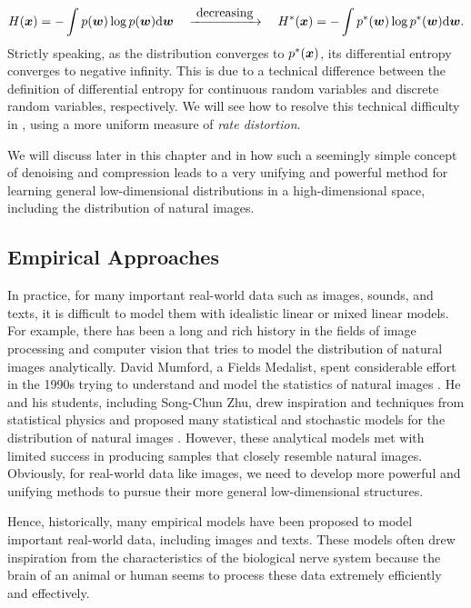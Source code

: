 \documentclass[../../book-main.tex]{subfiles}
\begin{document}
\begin{equation}
H(\bm{x}) = - \int p(\boldsymbol{w}) \log p(\boldsymbol{w}) \mathrm{d}\boldsymbol{w}  \quad \xrightarrow{\hspace{1mm} \mbox{decreasing} \hspace{1mm}} \quad H^*(\bm{x}) = - \int p^*(\boldsymbol{w}) \log p^*(\boldsymbol{w}) \mathrm{d}\boldsymbol{w}.    
\end{equation}
Strictly speaking, as the distribution converges to $p^*(\bm{x})$, its differential entropy converges to negative infinity. This is due to a technical difference between the definition of differential entropy for continuous random variables and discrete random variables, respectively. We will see how to resolve this technical difficulty in , using a more uniform measure of {\em rate distortion}.


We will discuss later in this chapter and in  how such a seemingly simple concept of denoising and compression leads to a very unifying and powerful method for learning general low-dimensional distributions in a high-dimensional space, including the distribution of natural images. 

\subsection{Empirical Approaches}
In practice, for many important real-world data such as images, sounds, and texts, it is difficult to model them with idealistic linear or mixed linear models. For example, there has been a long and rich history in the fields of image processing and computer vision that tries to model the distribution of natural images analytically. David Mumford, a Fields Medalist, spent considerable effort in the 1990s trying to understand and model the statistics of natural images \cite{Mumford1996TheSD}. He and his students, including Song-Chun Zhu, drew inspiration and techniques from statistical physics and proposed many statistical and stochastic models for the distribution of natural images \cite{Zhu-Entropy-1997,Zhu1997LearningGP,Zhu1997Prior,Huang-Mumford,Mumford-1999,Lee-Mumford}. However, these analytical models met with limited success in producing samples that closely resemble natural images. Obviously, for real-world data like images, we need to develop more powerful and unifying methods to pursue their more general low-dimensional structures.

Hence, historically, many empirical models have been proposed to model important real-world data, including images and texts. These models often drew inspiration from the characteristics of the biological nerve system because the brain of an animal or human seems to process these data extremely efficiently and effectively. 
\end{document}
